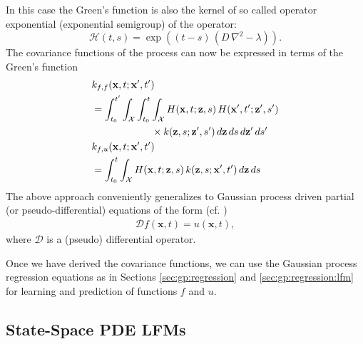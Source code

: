 \documentclass[journal]{IEEEtran}
\begin{document}
In this case the Green's function is also the kernel of so called operator exponential (exponential semigroup) of the operator:
%
\begin{equation}
  \mathcal{H}(t, s) = \exp\left( (t-s) \, (D \, \nabla^2 - \lambda) \right).
\end{equation}
%
The covariance functions of the process can now be expressed in terms of the Green's function
%
\begin{equation}
\begin{split}
  &k_{f,f}(\mathbf{x}, t; \mathbf{x}', t') \\
  &=
  \int_{t_0}^{t'} \int_{\mathcal{X}} \int_{t_0}^{t}  \int_{\mathcal{X}} 
  H(\mathbf{x}, t; \mathbf{z}, s) \,
  H(\mathbf{x}', t'; \mathbf{z}', s') \\ 
   &\qquad \qquad \qquad \times
  k(\mathbf{z}, s; \mathbf{z}', s') \, d\mathbf{z} \, ds \, d\mathbf{z}' \, ds' \\
  &k_{f,u}(\mathbf{x}, t; \mathbf{x}', t') \\
  &=
  \int_{t_0}^{t}  \int_{\mathcal{X}} 
  H(\mathbf{x}, t; \mathbf{z}, s) \,
  k(\mathbf{z}, s; \mathbf{x}', t') \, d\mathbf{z} \, ds 
\end{split}
\notag
\end{equation}
%
The above approach conveniently generalizes to Gaussian process driven partial (or pseudo-differential) equations of the form (cf. \cite{Sarkka:2011})
\begin{align*}
  \mathcal{D} f(\mathbf{x},t) = u(\mathbf{x},t),
\end{align*}
%
where $\mathcal{D}$ is a (pseudo) differential operator.

Once we have derived the covariance functions, we can use the Gaussian process regression equations as in Sections \ref{sec:gp:regression} and \ref{sec:gp:regression:lfm} for learning and prediction of functions $f$ and $u$.

\subsection{State-Space PDE LFMs}
\end{document}
